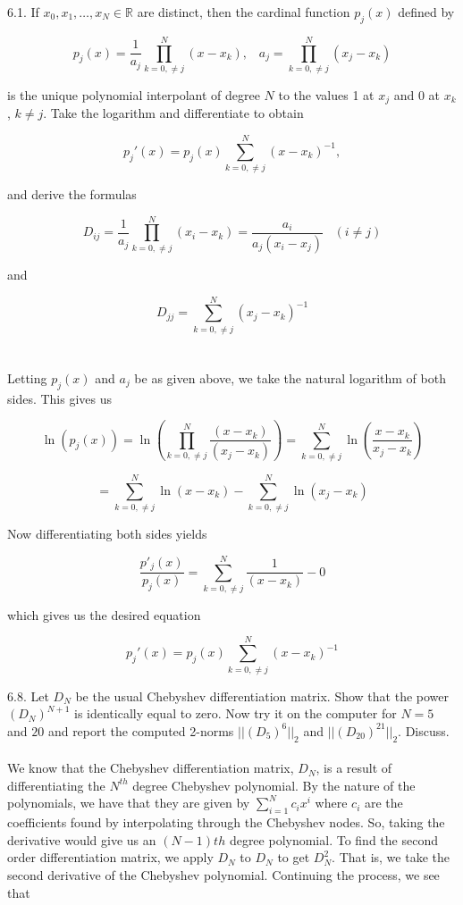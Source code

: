 \documentclass[12pt]{article}
\begin{document}

\newpage

6.1. If $x_0,x_1,\ldots,x_N\in\mathbb{R}$ are distinct, then the cardinal function $p_j(x)$ defined by

$$p_j(x)=\frac{1}{a_j}\prod_{k=0,\neq j}^N(x-x_k),\;\;\;a_j=\prod_{k=0,\neq j}^N(x_j-x_k)$$

is the unique polynomial interpolant of degree $N$ to the values 1 at $x_j$ and 0 at $x_k$, $k\neq j$.
Take the logarithm and differentiate to obtain

$$p_j'(x)=p_j(x)\sum_{k=0,\neq j}^N(x-x_k)^{-1},$$

and derive the formulas

$$D_{ij}=\frac{1}{a_j}\prod_{k=0,\neq j}^N(x_i-x_k)=\frac{a_i}{a_j(x_i-x_j)}\;\;\;(i\neq j)$$

and

$$D_{jj}=\sum_{k=0,\neq j}^N(x_j-x_k)^{-1}$$\\\\

Letting $p_j(x)$ and $a_j$ be as given above, we take the natural logarithm of both sides. This gives us

$$\ln(p_j(x))=\ln(\prod_{k=0,\neq j}^N\frac{(x-x_k)}{(x_j-x_k)})=\sum_{k=0,\neq j}^N\ln(\frac{x-x_k}{x_j-x_k})$$

$$=\sum_{k=0,\neq j}^N\ln(x-x_k)-\sum_{k=0,\neq j}^N\ln(x_j-x_k)$$

Now differentiating both sides yields

$$\frac{p'_j(x)}{p_j(x)}=\sum_{k=0,\neq j}^N\frac{1}{(x-x_k)}-0$$

which gives us the desired equation

$$p_j'(x)=p_j(x)\sum_{k=0,\neq j}^N(x-x_k)^{-1}$$

\newpage

6.8. Let $D_N$ be the usual Chebyshev differentiation matrix. Show that the power $(D_N)^{N+1}$ is identically
equal to zero. Now try it on the computer for $N=5$ and $20$ and report the computed 2-norms $||(D_5)^6||_2$
and $||(D_{20})^{21}||_2$. Discuss.\\\\

We know that the Chebyshev differentiation matrix, $D_N$, is a result of differentiating the $N^{th}$ degree Chebyshev 
polynomial. By the nature of the polynomials, we have that they are given by $\sum_{i=1}^Nc_ix^i$ where $c_i$ are the 
coefficients found by interpolating through the Chebyshev nodes. So, taking the derivative would give us an $(N-1)th$ 
degree polynomial. To find the second order differentiation matrix, we apply $D_N$ to $D_N$ to get $D_N^2$. That is, we 
take the second derivative of the Chebyshev polynomial. Continuing the process, we see that
\end{document}

